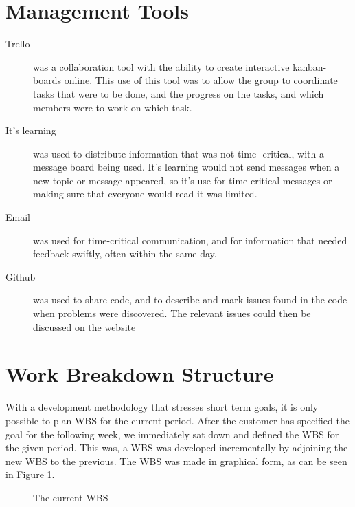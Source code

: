 \section{Management Tools}
 
\begin{description}
\item[Trello] \label{def:trello} was a collaboration tool with the ability to create interactive kanban-boards online. This use of this tool was to allow the group to coordinate tasks that were to be done, and the progress on the tasks, and which members were to work on which task. 
\item[It's learning] was used to distribute information that was not time -critical, with a message board being used. It's learning would not send messages when a new topic or message appeared, so it's use for time-critical messages or making sure that everyone would read it was limited. 
\item[Email] was used for time-critical communication, and for information that needed feedback swiftly, often within the same day.
\item[Github] \label{def:github} was used to share code, and to describe and mark issues found in the code when problems were discovered. The relevant issues could then be discussed on the website
\end{description}
\section{Work Breakdown Structure}
With a development methodology that stresses short term goals, it is only possible to plan WBS for the current period. After the customer has specified the goal for the following week, we immediately sat down and defined the WBS for the given period. This was, a WBS was developed incrementally by adjoining the new WBS to the previous. The WBS was made in graphical form, as can be seen in Figure \ref{fig:WBS}.

\begin{figure}[p]

\setlength\fboxsep{0pt}
\setlength\fboxrule{1pt}\noindent{}
\label{fig:WBS}
\caption{The current WBS}
\end{figure}